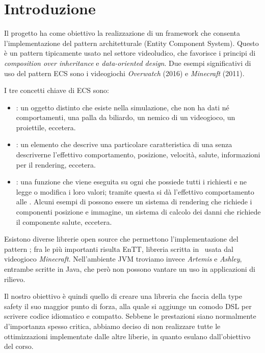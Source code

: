 \chapter*{Introduzione}
Il progetto ha come obiettivo la realizzazione di un framework che consenta l'implementazione del pattern
architetturale \ECS (Entity Component System).
Questo è un pattern tipicamente usato nel settore videoludico, che favorisce i principi di
\textit{composition over inheritance} e \textit{data-oriented design}.
Due esempi significativi di uso del pattern ECS sono i videogiochi \textit{Overwatch} (2016) e \textit{Minecraft}
(2011).

I tre concetti chiave di ECS sono:
\begin{itemize}
    \item \Entity: un oggetto distinto che esiste nella simulazione, che non ha dati né comportamenti,
    \eg una palla da biliardo, un nemico di un videogioco, un proiettile, eccetera.
    \item \Component: un elemento che descrive una particolare caratteristica di una \Entity senza descriverne
    l'effettivo comportamento, \eg posizione, velocità, salute, informazioni per il rendering, eccetera.
    \item \System: una funzione che viene eseguita su ogni \Entity che possiede tutti i \Component richiesti e ne
    legge o modifica i loro valori;
    tramite questa si dà l'effettivo comportamento alle \Entity.
    Alcuni esempi di \System possono essere un sistema di rendering che richiede i componenti posizione e immagine,
    un sistema di calcolo dei danni che richiede il componente salute, eccetera.
\end{itemize}

Esistono diverse librerie open source che permettono l'implementazione del pattern \ECS; fra le più importanti risulta
EnTT, libreria scritta in \CC\ usata dal videogioco \textit{Minecraft}.
Nell'ambiente JVM troviamo invece \textit{Artemis} e \textit{Ashley}, entrambe scritte in Java, che però non possono
vantare un uso in applicazioni di rilievo.

Il nostro obiettivo è quindi quello di creare una libreria che faccia della type safety il suo maggior punto di forza,
alla quale si aggiunge un comodo DSL per scrivere codice idiomatico e compatto.
Sebbene le prestazioni siano normalmente d'importanza spesso critica, abbiamo deciso di non realizzare tutte le
ottimizzazioni implementate dalle altre liberie, in quanto esulano dall'obiettivo del corso.